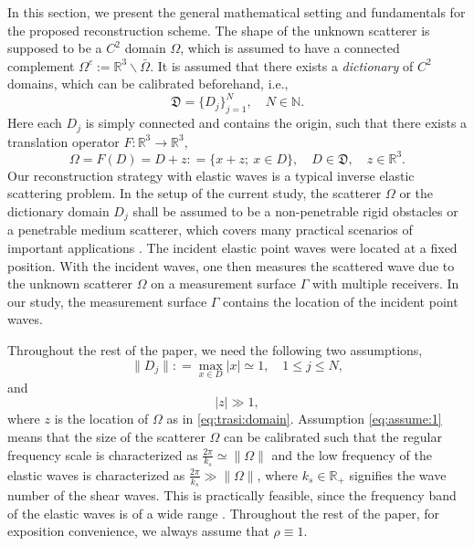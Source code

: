 \documentclass[a4paper,11pt]{article}
\theoremstyle{remark}
\theoremstyle{definition}
\numberwithin{equation}{section}
\begin{document}
In this section, we present the general mathematical setting and fundamentals for the proposed reconstruction scheme.
The shape of the unknown scatterer is supposed to be a $C^2$ domain $\Omega$, which is assumed to have a connected complement $\Omega^c := \mathbb{R}^{3} \backslash \bar \Omega$. It is assumed that there exists a {\it dictionary} of $C^2$ domains, which can be calibrated beforehand, i.e.,
\begin{equation}\label{eq:dic:class}
\mathfrak{D} = \{ D_j\}_{j=1}^{N}, \quad N \in \mathbb{N}.
\end{equation}
Here each $D_j$ is simply connected and contains the origin, such that there exists a translation operator $F: \mathbb{R}^3 \rightarrow \mathbb{R}^3$,
\begin{equation}\label{eq:trasi:domain}
\Omega = F(D) = D + z: = \{ x+z; \ x \in D \}, \quad D  \in \mathfrak{D}, \quad z \in \mathbb{R}^3.
\end{equation}
Our reconstruction strategy with elastic waves is a typical inverse elastic scattering problem.  In the setup of the current study, the scatterer $\Omega$ or the dictionary domain $D_j$ shall be assumed to be a non-penetrable rigid obstacles or a penetrable medium scatterer, which  covers many practical scenarios of important applications \cite{AR,Kup}. The incident elastic point waves were located at a fixed position. With the incident waves, one then measures the scattered wave due to the unknown scatterer $\Omega$ on a measurement surface $\Gamma$ with multiple receivers. In our study, the measurement surface $\Gamma$ contains the location of the incident point waves.



Throughout the rest of the paper, we need the following two assumptions,
\begin{equation}\label{eq:assume:1}
\|D_j\|: = \max_{x \in D} |x| \simeq 1, \quad 1 \leq j \leq N,
\end{equation}
and
\begin{equation}\label{eq:assume:2}
|z| \gg 1,
\end{equation}
where $z$ is the location of $\Omega$ as in \eqref{eq:trasi:domain}. Assumption \eqref{eq:assume:1} means that the size of the scatterer $\Omega$ can be calibrated such that the regular frequency scale is characterized as $\frac{2 \pi}{k_s} \simeq \|\Omega\|$ and the low frequency of the elastic waves is characterized as $\frac{2 \pi}{k_s} \gg \|\Omega\|$, where $k_s\in\mathbb{R}_+$ signifies the wave number of the shear waves. This is practically feasible, since the frequency band of the elastic waves is of a wide range \cite{AR}. Throughout the rest of the paper, for exposition convenience, we always assume that $\rho\equiv 1$.
\end{document}
